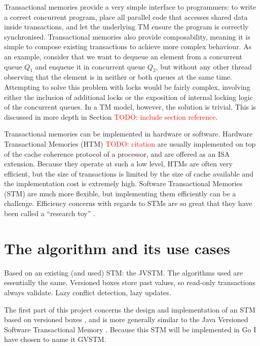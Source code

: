 \documentclass[12pt,a4paper,twoside,openright]{report}
\newcommand{\todo}[1]{\textcolor{red}{TODO: #1}}
\begin{document}
Transactional memories provide a very simple interface to programmers:
to write a correct concurrent program, place all parallel code that
accesses shared data inside transactions, and let the underlying TM
ensure the program is correctly synchronised. Transactional memories
also provide composability, meaning it is simple to compose existing
transactions to achieve more complex behaviour. As an example,
consider that we want to dequeue an element from a concurrent queue
$Q_1$ and enqueue it in concurrent queue $Q_2$, but without any other
thread observing that the element is in neither or both queues at the
same time. Attempting to solve this problem with locks would be fairly
complex, involving either the inclusion of additional locks or the
exposition of internal locking logic of the concurrent queues. In a TM
model, however, the solution is trivial. This is discussed in more
depth in Section \todo{include section reference}.

Transactional memories can be implemented in hardware or
software. Hardware Transactional Memories (HTM) \todo{citation} are
usually implemented on top of the cache coherence protocol of a
processor, and are offered as an ISA extension. Because they
operate at such a low level, HTMs are often very efficient, but the
size of transactions is limited by the size of cache available and the
implementation cost is extremely high. Software Transactional Memories
(STM) \cite{STM} are much more flexible, but implementing them
efficiently can be a challenge. Efficiency concerns with regards to
STMs are so great that they have been called a ``research toy''
\cite{toy}.

\section{The algorithm and its use cases}
\label{sec:algorithm-its-use}

Based on an existing (and used) STM: the JVSTM.  The algorithms used
are essentially the same.  Versioned boxes store past values, so
read-only transactions always validate.  Lazy conflict detection, lazy
updates.

\cite{carvalho2008versioned}

The first part of this project concerns the design and implementation
of an STM based on versioned boxes \cite{cachopo2006vbb}, and is more
generally similar to the Java Versioned Software Transactional Memory
\cite{www:jvstm}. Because this STM will be implemented in Go I have
chosen to name it GVSTM.
\end{document}
